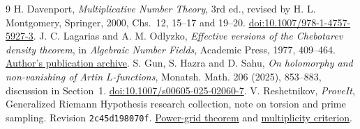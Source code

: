 \documentclass[11pt]{article}
\begin{document}
\begin{thebibliography}{9}
 H. Davenport, \emph{Multiplicative Number Theory}, 3rd ed., revised by H. L. Montgomery, Springer, 2000, Chs.~12, 15--17 and 19--20. \href{https://doi.org/10.1007/978-1-4757-5927-3}{doi:10.1007/978-1-4757-5927-3}.
 J. C. Lagarias and A. M. Odlyzko, \emph{Effective versions of the Chebotarev density theorem}, in \emph{Algebraic Number Fields}, Academic Press, 1977, 409--464. \href{https://www-users.cse.umn.edu/~odlyzko/doc/zeta.html}{Author's publication archive}.
 S. Gun, S. Hazra and D. Sahu, \emph{On holomorphy and non-vanishing of Artin $L$-functions}, Monatsh. Math. 206 (2025), 853--883, discussion in Section~1. \href{https://doi.org/10.1007/s00605-025-02060-7}{doi:10.1007/s00605-025-02060-7}.
 V. Reshetnikov, \emph{ProveIt}, Generalized Riemann Hypothesis research collection, note on torsion and prime sampling. Revision \texttt{2c45d198070f}. \href{https://github.com/VladimirReshetnikov/ProveIt/blob/2c45d198070f93209d6f0faa2d387ef0a2c4e72c/Analysis/GeneralizedRiemannHypothesis/Research/grh-torsion-and-prime-sampling/sections/powers.tex}{Power-grid theorem} and \href{https://github.com/VladimirReshetnikov/ProveIt/blob/2c45d198070f93209d6f0faa2d387ef0a2c4e72c/Analysis/GeneralizedRiemannHypothesis/Research/grh-torsion-and-prime-sampling/sections/simplicity.tex}{multiplicity criterion}.
\end{thebibliography}
\end{document}
